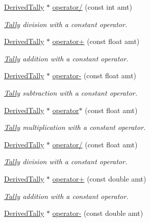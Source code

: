 \begin{DoxyCompactItemize}
\hyperlink{classDerivedTally}{Derived\-Tally} $\ast$ \hyperlink{classTally_a8bffb42dbecf2d27335ec82de3fdfa25}{operator/} (const int amt)
\begin{DoxyCompactList}\small\item\em \hyperlink{classTally}{Tally} division with a constant operator. \end{DoxyCompactList}\item 
\hyperlink{classDerivedTally}{Derived\-Tally} $\ast$ \hyperlink{classTally_a6cd03551311465fe6e2b45b0bc69a2c6}{operator+} (const float amt)
\begin{DoxyCompactList}\small\item\em \hyperlink{classTally}{Tally} addition with a constant operator. \end{DoxyCompactList}\item 
\hyperlink{classDerivedTally}{Derived\-Tally} $\ast$ \hyperlink{classTally_a278bfee53b40a392b0b6db258829e755}{operator-\/} (const float amt)
\begin{DoxyCompactList}\small\item\em \hyperlink{classTally}{Tally} subtraction with a constant operator. \end{DoxyCompactList}\item 
\hyperlink{classDerivedTally}{Derived\-Tally} $\ast$ \hyperlink{classTally_a7dba6e707d83273d2f3c94468ff5ed7e}{operator$\ast$} (const float amt)
\begin{DoxyCompactList}\small\item\em \hyperlink{classTally}{Tally} multiplication with a constant operator. \end{DoxyCompactList}\item 
\hyperlink{classDerivedTally}{Derived\-Tally} $\ast$ \hyperlink{classTally_a95b5dbad09760c1ef6887887d6b0da70}{operator/} (const float amt)
\begin{DoxyCompactList}\small\item\em \hyperlink{classTally}{Tally} division with a constant operator. \end{DoxyCompactList}\item 
\hyperlink{classDerivedTally}{Derived\-Tally} $\ast$ \hyperlink{classTally_ae30c13c864d0b983730c21e5ac1c64f8}{operator+} (const double amt)
\begin{DoxyCompactList}\small\item\em \hyperlink{classTally}{Tally} addition with a constant operator. \end{DoxyCompactList}\item 
\hyperlink{classDerivedTally}{Derived\-Tally} $\ast$ \hyperlink{classTally_aa4a6dab9e7ee4d473cf84128a0d042b2}{operator-\/} (const double amt)

\end{DoxyCompactItemize}
